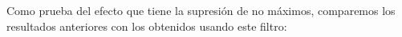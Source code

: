 \documentclass[11pt,a4paper]{article}
\begin{document}
                \par
                Como prueba del efecto que tiene la supresión de no máximos, comparemos los resultados anteriores con los obtenidos usando este filtro:

                \begin{figure}[H]

    		        \begin{center}

    		        	\setlength{\fboxrule}{0pt}
\end{center}
\end{figure}
\end{document}
